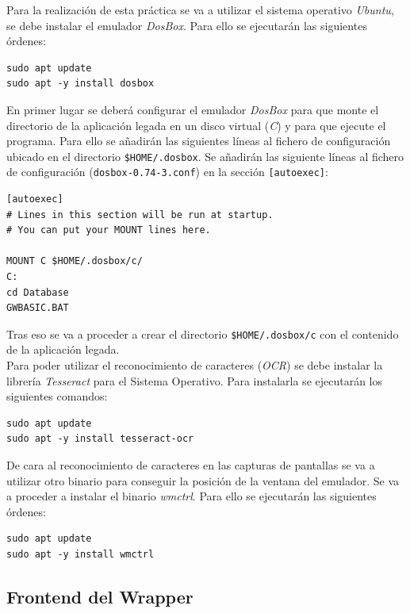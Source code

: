 \documentclass[10pt,a4paper]{article}
\begin{document}
Para la realización de esta práctica se va a utilizar el sistema operativo \emph{Ubuntu}, se debe instalar el emulador \emph{DosBox}. Para ello se ejecutarán las siguientes órdenes:

\begin{lstlisting}
sudo apt update
sudo apt -y install dosbox
\end{lstlisting}


En primer lugar se deberá configurar el emulador \emph{DosBox} para que monte el directorio de la aplicación legada en un disco virtual (\emph{C}) y para que ejecute el programa. Para ello se añadirán las siguientes líneas al fichero de configuración ubicado en el directorio \texttt{\$HOME/.dosbox}. Se añadirán las siguiente líneas al fichero de configuración (\texttt{dosbox-0.74-3.conf}) en la sección \texttt{[autoexec]}:

\begin{lstlisting}
[autoexec]
# Lines in this section will be run at startup.
# You can put your MOUNT lines here.

MOUNT C $HOME/.dosbox/c/
C:
cd Database
GWBASIC.BAT
\end{lstlisting}

Tras eso se va a proceder a crear el directorio \texttt{\$HOME/.dosbox/c} con el contenido de la aplicación legada.\\

Para poder utilizar el reconocimiento de caracteres (\emph{OCR}) se debe instalar la librería \emph{Tesseract} para el Sistema Operativo. Para instalarla se ejecutarán los siguientes comandos:

\begin{lstlisting}
sudo apt update
sudo apt -y install tesseract-ocr
\end{lstlisting}

De cara al reconocimiento de caracteres en las capturas de pantallas se va a utilizar otro binario para conseguir la posición de la ventana del emulador. Se va a proceder a instalar el binario \emph{wmctrl}. Para ello se ejecutarán las siguientes órdenes:

\begin{lstlisting}
sudo apt update
sudo apt -y install wmctrl
\end{lstlisting}


\subsection{Frontend del Wrapper}
\end{document}
